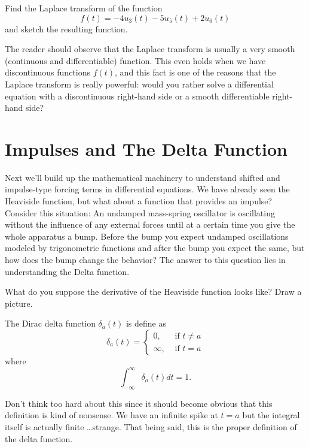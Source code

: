\begin{problem}
    Find the Laplace transform of the function 
    \[ f(t) = -4 u_3(t) - 5 u_5(t) + 2 u_6(t) \]
    and sketch the resulting function.
\end{problem}

The reader should observe that the Laplace transform is usually a very smooth (continuous
and differentiable) function.  This even holds when we have discontinuous functions
$f(t)$, and this fact is one of the reasons that the Laplace transform is really powerful:
would you rather solve a differential equation with a discontinuous right-hand side or a
smooth differentiable right-hand side?

\newpage\section{Impulses and The Delta Function}

Next we'll build up the mathematical machinery to understand shifted and impulse-type
forcing terms in differential equations.  We have already seen the Heaviside function, but
what about a function that provides an impulse?  Consider this situation: An undamped mass-spring
oscillator is oscillating without the influence of any external forces until at a certain
time you give the whole apparatus a bump.  Before the bump you expect undamped
oscillations modeled by trigonometric functions and after the bump you expect the same,
but how does the bump change the behavior?  The answer to this question lies in
understanding the Delta function. 

\begin{problem}
    What do you suppose the derivative of the Heaviside function looks like?  Draw a picture.
\end{problem}

\begin{definition}
    The Dirac delta function $\delta_a(t)$ is define as
    \[ \delta_a(t) = \left\{ \begin{array}{cc} 0, & \text{ if } t \neq a \\ \infty, &
            \text{ if } t=a \end{array} \right. \]
    where 
    \[ \int_{-\infty}^\infty \delta_a(t) dt = 1. \]
\end{definition}
Don't think too hard about this since it should become obvious that this definition is
kind of nonsense.  We have an infinite spike at $t=a$ but the integral itself is actually
finite \ldots strange. That being said, this is the proper definition of the delta
function.

